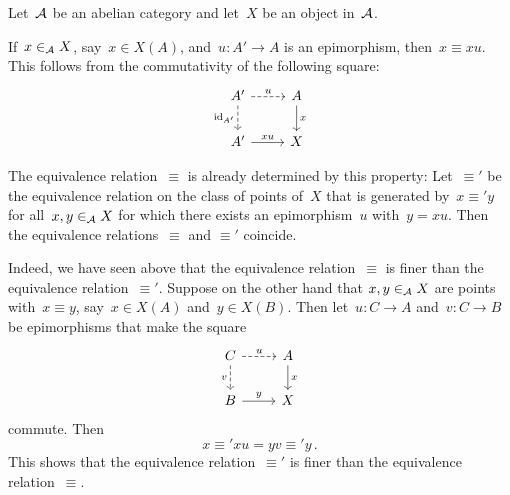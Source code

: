 \begin{remark*}
  Let~$\mathcal{A}$ be an abelian category and let~$X$ be an object in~$\mathcal{A}$.
  
  If~$x \in_{\mathcal{A}} X$, say~$x \in X(A)$, and~$u \colon A' \to A$ is an epimorphism, then~$x \equiv xu$.
  This follows from the commutativity of the following square:
  \[
    \begin{tikzcd}
        A'
        \arrow[dashed]{r}[above]{u}
        \arrow[dashed]{d}[left]{\id_{A'}}
      & A
        \arrow{d}[right]{x}
      \\
        A'
        \arrow{r}[above]{xu}
      & X
    \end{tikzcd}
  \]
  
  The equivalence relation~$\equiv$ is already determined by this property:
  Let~$\equiv'$ be the equivalence relation on the class of points of~$X$ that is generated by~$x \equiv' y$ for all~$x, y \in_{\mathcal{A}} X$ for which there exists an epimorphism~$u$ with~$y = xu$.
  Then the equivalence relations~$\equiv$ and $\equiv'$ coincide.
  
  Indeed, we have seen above that the equivalence relation~$\equiv$ is finer than the equivalence relation~$\equiv'$.
  Suppose on the other hand  that $x, y \in_{\mathcal{A}} X$ are points with~$x \equiv y$, say~$x \in X(A)$ and~$y \in X(B)$.
  Then let~$u \colon C \to A$ and~$v \colon C \to B$ be epimorphisms that make the square
  \[
    \begin{tikzcd}
        C
        \arrow[dashed]{r}[above]{u}
        \arrow[dashed]{d}[left]{v}
      & A
        \arrow{d}[right]{x}
      \\
        B
        \arrow{r}[above]{y}
      & X
    \end{tikzcd}
  \]
  commute.
  Then
  \[
            x
    \equiv' x u 
    =       y v
    \equiv' y \,.
  \]
  This shows that the equivalence relation~$\equiv'$ is finer than the equivalence relation~$\equiv$.
\end{remark*}



